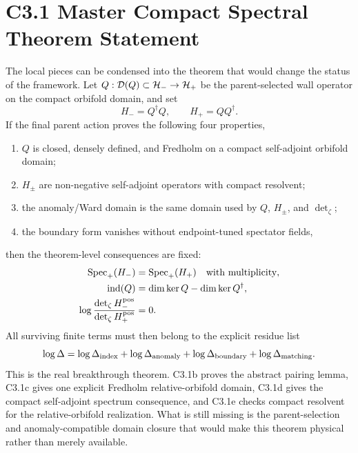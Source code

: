 \documentclass[11pt]{article}
\begin{document}
\section{C3.1 Master Compact Spectral Theorem Statement}
The local pieces can be condensed into the theorem that would change the status
of the framework.  Let $Q:{\cal D}(Q)\subset{\cal H}_-\to{\cal H}_+$ be
the parent-selected wall operator on the compact orbifold domain, and set
\begin{equation}
H_-=Q^\dagger Q,\qquad H_+=QQ^\dagger .
\end{equation}
If the final parent action proves the following four properties,
\begin{enumerate}
\item $Q$ is closed, densely defined, and Fredholm on a compact self-adjoint
orbifold domain;
\item $H_\pm$ are non-negative self-adjoint operators with compact resolvent;
\item the anomaly/Ward domain is the same domain used by $Q$, $H_\pm$, and
$\det_\zeta$;
\item the boundary form vanishes without endpoint-tuned spectator fields,
\end{enumerate}
then the theorem-level consequences are fixed:
\begin{align}
{\rm Spec}_+(H_-)&={\rm Spec}_+(H_+)\quad\text{with multiplicity},\\
{\rm ind}(Q)&=\dim\ker Q-\dim\ker Q^\dagger,\\
\log\frac{\det_\zeta H_-^{\rm pos}}{\det_\zeta H_+^{\rm pos}}&=0 .
\end{align}
All surviving finite terms must then belong to the explicit residue list
\begin{equation}
\log\Delta
=
\log\Delta_{\rm index}
+\log\Delta_{\rm anomaly}
+\log\Delta_{\rm boundary}
+\log\Delta_{\rm matching} .
\end{equation}
This is the real breakthrough theorem.  C3.1b proves the abstract pairing
lemma, C3.1c gives one explicit Fredholm relative-orbifold domain, C3.1d gives
the compact self-adjoint spectrum consequence, and C3.1e checks compact
resolvent for the relative-orbifold realization.  What is still missing is the
parent-selection and anomaly-compatible domain closure that would make this
theorem physical rather than merely available.
\end{document}
